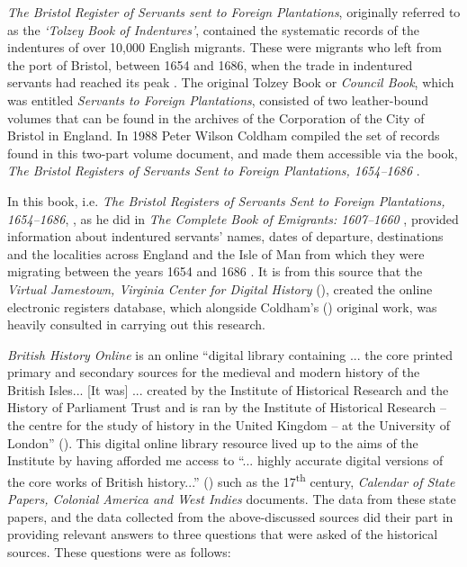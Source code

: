 \emph{The Bristol Register of Servants sent to Foreign Plantations}, originally referred to as the \emph{`Tolzey Book of Indentures'}, contained the systematic records of the indentures of over 10,000 English migrants. These were migrants who left from the port of Bristol, between 1654 and 1686, when the trade in indentured servants had reached its peak \citep{Smith47, Morgan93}. The original Tolzey Book or \emph{Council Book}, which was entitled \emph{Servants to Foreign Plantations}, consisted of two leather-bound volumes that can be found in the archives of the Corporation of the City of Bristol in England. In 1988 Peter Wilson Coldham compiled the set of records found in this two-part volume document, and made them accessible via the book, \emph{The Bristol Registers of Servants Sent to Foreign Plantations, 1654--1686} \citep{Coldham88}.

In this book, i.e. \emph{The Bristol Registers of Servants Sent to Foreign Plantations, 1654--1686}, \citet{Coldham88}, as he did in \emph{The Complete Book of Emigrants: 1607--1660} \citep{Coldham92, Coldham87}, provided information about indentured servants' names, dates of departure, destinations and the localities across England and the Isle of Man from which they were migrating between the years 1654 and 1686 \citep{Sacks93}. It is from this source that the  \emph{Virtual Jamestown, Virginia Center for Digital History} (\citeauthor{vcdh}), created the online electronic registers database, which alongside Coldham's (\citeyear{Coldham92, Coldham87}) original work, was heavily consulted in carrying out this research.

\emph{British History Online} is an online ``digital library containing ... the core printed primary and secondary sources for the medieval and modern history of the British Isles... [It was] ... created by the Institute of Historical Research and the History of Parliament Trust and is ran by the Institute of Historical Research -- the centre for the study of history in the United Kingdom -- at the University of London''  (\citeauthor{bho09}). This digital online library resource lived up to the aims of the Institute by having afforded me access to ``... highly accurate digital versions of the core works of British history...'' (\citeauthor{bho09}) such as the 17\textsuperscript{th} century, \emph{Calendar of State Papers, Colonial America and West Indies} documents. The data from these state papers, and the data collected from the above-discussed sources did their part in providing relevant answers to three questions that were asked of the historical sources. These questions were as follows:

